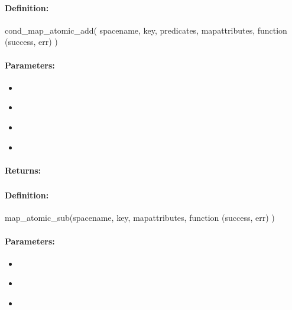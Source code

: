 \paragraph{Definition:}
\begin{javascriptcode}
cond_map_atomic_add(
        spacename, key, predicates, mapattributes, function (success, err) {})
\end{javascriptcode}
\paragraph{Parameters:}
\begin{itemize}[noitemsep]
\item {}\\

\item {}\\

\item {}\\

\item {}\\

\end{itemize}

\paragraph{Returns:}


\pagebreak
\subsubsection{}
\label{api:nodejs:map_atomic_sub}


\paragraph{Definition:}
\begin{javascriptcode}
map_atomic_sub(spacename, key, mapattributes, function (success, err) {})
\end{javascriptcode}
\paragraph{Parameters:}
\begin{itemize}[noitemsep]
\item {}\\

\item {}\\

\item {}\\

\end{itemize}

